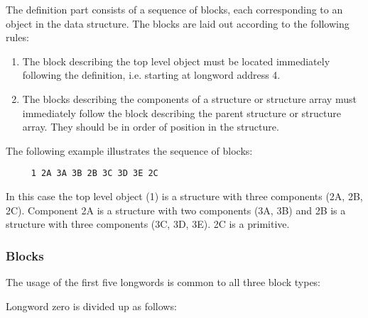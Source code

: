 The definition part consists of a sequence of blocks, each corresponding to an
object in the data structure. The blocks are laid out according to the
following rules:

\begin{enumerate}

\item The block describing the top level object must be located immediately
following the definition, i.e. starting at longword address 4.

\item The blocks describing the components of a structure or structure array
must immediately follow the block describing the parent structure or structure
array. They should be in order of position in the structure.

\end{enumerate}

The following example illustrates the sequence of blocks:

\begin{verbatim}
     1 2A 3A 3B 2B 3C 3D 3E 2C
\end{verbatim}

In this case the top level object (1) is a structure with three components (2A,
2B, 2C). Component 2A is a structure with two components (3A, 3B) and 2B is a
structure with three components (3C, 3D, 3E). 2C is a primitive.

\subsubsection{Blocks}

The usage of the first five longwords is common to all three block types:

Longword zero is divided up as follows:

